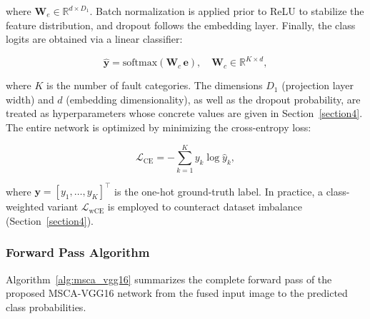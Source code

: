\documentclass[journal]{IEEEtran}
\begin{document}
where $\boldsymbol{W}_{\!e} \in \mathbb{R}^{d \times D_1}$. Batch normalization is applied prior to ReLU to stabilize the feature distribution, and dropout follows the embedding layer. Finally, the class logits are obtained via a linear classifier:

\begin{equation}
\hat{\boldsymbol{y}} = \mathrm{softmax}(\boldsymbol{W}_{\!c}\, \boldsymbol{e}), \quad \boldsymbol{W}_{\!c} \in \mathbb{R}^{K \times d},
\label{eq:classifier}
\end{equation}

where $K$ is the number of fault categories. The dimensions $D_1$ (projection layer width) and $d$ (embedding dimensionality), as well as the dropout probability, are treated as hyperparameters whose concrete values are given in Section~\ref{section4}. The entire network is optimized by minimizing the cross-entropy loss:

\begin{equation}
\mathcal{L}_{\mathrm{CE}} = -\sum_{k=1}^{K} y_k \log \hat{y}_k,
\label{eq:cross_entropy_loss}
\end{equation}

where $\boldsymbol{y} = [y_1, \dots, y_K]^\top$ is the one-hot ground-truth label. In practice, a class-weighted variant $\mathcal{L}_{\mathrm{wCE}}$ is employed to counteract dataset imbalance (Section~\ref{section4}).

\subsubsection{Forward Pass Algorithm}

Algorithm~\ref{alg:msca_vgg16} summarizes the complete forward pass of the proposed MSCA-VGG16 network from the fused input image to the predicted class probabilities.
\end{document}
